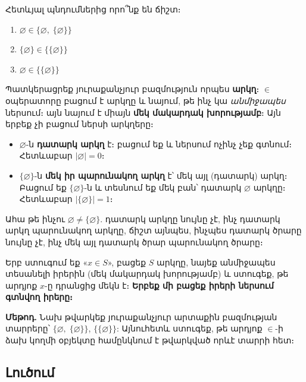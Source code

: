 \documentclass[12pt, a4paper]{article}
\begin{document}
\begin{problembox}
Հետևյալ պնդումներից որո՞նք են ճիշտ։
\begin{enumerate}[label=2.\arabic*.]
  \item $\varnothing \in \{\varnothing,\; \{\varnothing\}\}$
  \item $\{\varnothing\} \in \{\{\varnothing\}\}$
  \item $\varnothing \in \{\{\varnothing\}\}$
\end{enumerate}
\end{problembox}

\medskip
\begin{tcolorbox}[colback=blue!3, colframe=setA!60!black, arc=2mm, left=5pt, right=5pt, top=5pt, bottom=5pt, title={\small Արկղի անալոգիա. Ինչպե՞ս է աշխատում $\in$-ը}]
Պատկերացրեք յուրաքանչյուր բազմություն որպես \textbf{արկղ}։ $\in$ օպերատորը բացում է արկղը և նայում, թե ինչ կա \emph{անմիջապես} ներսում։ այն նայում է միայն \textbf{մեկ մակարդակ խորությամբ}։ Այն երբեք չի բացում ներսի արկղերը։

\begin{itemize}[nosep]
  \item $\varnothing$-ն \textbf{դատարկ արկղ} է։ բացում եք և ներսում ոչինչ չեք գտնում։
        Հետևաբար $|\varnothing| = 0$։
  \item $\{\varnothing\}$-ն \textbf{մեկ իր պարունակող արկղ} է՝ մեկ այլ (դատարկ) արկղ։
        Բացում եք $\{\varnothing\}$-ն և տեսնում եք մեկ բան՝ դատարկ $\varnothing$ արկղը։
        Հետևաբար $|\{\varnothing\}| = 1$։
\end{itemize}

\medskip
Ահա թե ինչու $\varnothing \neq \{\varnothing\}$. դատարկ արկղը նույնը չէ, ինչ դատարկ արկղ պարունակող արկղը, ճիշտ այնպես, ինչպես դատարկ ծրարը նույնը չէ, ինչ մեկ այլ դատարկ ծրար պարունակող ծրարը։

Երբ ստուգում եք «$x \in S$», բացեք $S$ արկղը, նայեք անմիջապես տեսանելի իրերին (մեկ մակարդակ խորությամբ) և ստուգեք, թե արդյոք $x$-ը դրանցից մեկն է։ \textbf{Երբեք մի բացեք իրերի ներսում գտնվող իրերը։}
\end{tcolorbox}

\medskip
\textbf{Մեթոդ.} Նախ թվարկեք յուրաքանչյուր արտաքին բազմության տարրերը՝ $\{\varnothing,\;\{\varnothing\}\}$, $\{\{\varnothing\}\}$: Այնուհետև ստուգեք, թե արդյոք $\in$-ի ձախ կողմի օբյեկտը համընկնում է թվարկված որևէ տարրի հետ։

\subsection*{Լուծում}
\end{document}

